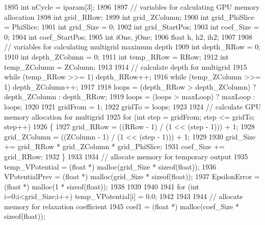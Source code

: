 \begin{DoxyCode}
1895     \textcolor{keywordtype}{int} nCycle  = iparam[3];
1896 
1897     \textcolor{comment}{// variables for calculating GPU memory allocation}
1898     \textcolor{keywordtype}{int} grid\_RRow;
1899     \textcolor{keywordtype}{int} grid\_ZColumn;
1900     \textcolor{keywordtype}{int} grid\_PhiSlice = PhiSlice;
1901     \textcolor{keywordtype}{int} grid\_Size = 0;
1902     \textcolor{keywordtype}{int} grid\_StartPos;
1903     \textcolor{keywordtype}{int} coef\_Size = 0;
1904     \textcolor{keywordtype}{int} coef\_StartPos;
1905     \textcolor{keywordtype}{int} iOne, jOne;
1906     \textcolor{keywordtype}{float} h, h2, ih2;
1907 
1908     \textcolor{comment}{// variables for calculating multigrid maximum depth}
1909     \textcolor{keywordtype}{int} depth\_RRow = 0;
1910     \textcolor{keywordtype}{int} depth\_ZColumn = 0;
1911     \textcolor{keywordtype}{int} temp\_RRow = RRow;
1912     \textcolor{keywordtype}{int} temp\_ZColumn = ZColumn;
1913 
1914     \textcolor{comment}{// calculate depth for multigrid}
1915     \textcolor{keywordflow}{while} (temp\_RRow >>= 1) depth\_RRow++;  
1916     \textcolor{keywordflow}{while} (temp\_ZColumn >>= 1) depth\_ZColumn++;
1917   
1918     loops = (depth\_RRow > depth\_ZColumn) ? depth\_ZColumn : depth\_RRow;
1919     loops = (loops > maxLoop) ? maxLoop : loops;
1920 
1921     gridFrom = 1;
1922     gridTo = loops;
1923 
1924     \textcolor{comment}{// calculate GPU memory allocation for multigrid}
1925     \textcolor{keywordflow}{for} (\textcolor{keywordtype}{int} step = gridFrom; step <= gridTo; step++)
1926     \{
1927         grid\_RRow = ((RRow - 1) / (1 << (step - 1))) + 1;
1928         grid\_ZColumn = ((ZColumn - 1) / (1 << (step - 1))) + 1;
1929         
1930         grid\_Size += grid\_RRow * grid\_ZColumn * grid\_PhiSlice;
1931         coef\_Size += grid\_RRow;
1932     \}
1933 
1934     \textcolor{comment}{// allocate memory for temporary output}
1935     temp\_VPotential         = (\textcolor{keywordtype}{float} *) malloc(grid\_Size * \textcolor{keyword}{sizeof}(\textcolor{keywordtype}{float}));
1936     VPotentialPrev = (\textcolor{keywordtype}{float} *) malloc(grid\_Size * \textcolor{keyword}{sizeof}(\textcolor{keywordtype}{float}));
1937     EpsilonError = (\textcolor{keywordtype}{float} *) malloc(1 * \textcolor{keyword}{sizeof}(\textcolor{keywordtype}{float}));
1938 
1939     
1940 
1941     \textcolor{keywordflow}{for} (\textcolor{keywordtype}{int} i=0;i<grid\_Size;i++) temp\_VPotential[i] = 0.0;
1942 
1943 
1944     \textcolor{comment}{// allocate memory for relaxation coefficient}
1945     coef1 = (\textcolor{keywordtype}{float} *) malloc(coef\_Size * \textcolor{keyword}{sizeof}(\textcolor{keywordtype}{float}));

\end{DoxyCode}
